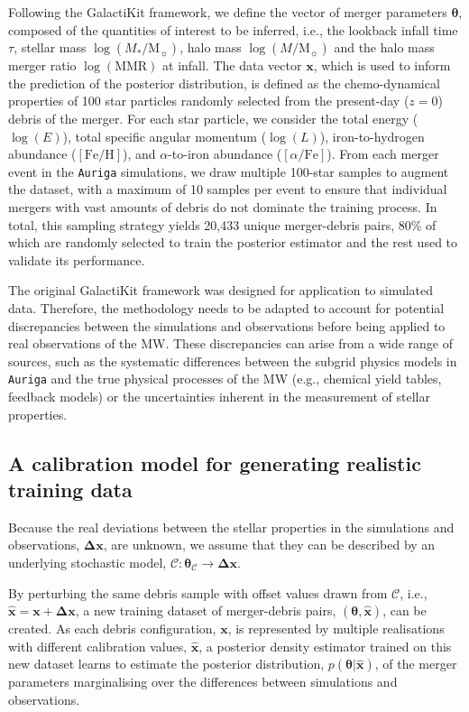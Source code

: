 Following the GalactiKit framework, we define the vector of merger parameters $\bm{\theta}$, composed of the quantities of interest to be inferred, i.e., the lookback infall time $\tau$, stellar mass $\log (M_*/\mathrm{M_{\sun}})$, halo mass $\log (M/\mathrm{M_{\sun}})$ and the halo mass merger ratio $\log (\mathrm{MMR})$ at infall. The data vector $\mathbf{x}$, which is used to inform the prediction of the posterior distribution, is defined as the  chemo-dynamical properties of 100 star particles randomly selected from the present-day ($z=0$) debris of the merger. For each star particle, we consider the total energy ($\log (E)$), total specific angular momentum ($\log (L)$), iron-to-hydrogen abundance ($[\mathrm{Fe}/\mathrm{H}]$), and $\alpha$-to-iron abundance ($[\alpha/\mathrm{Fe}]$).  From each merger event in the \texttt{Auriga} simulations, we draw multiple 100-star samples to augment the dataset, with a maximum of 10 samples per event to ensure that individual mergers with vast amounts of debris do not dominate the training process. In total, this sampling strategy yields 20,433 unique merger-debris pairs, 80\% of which are randomly selected to train the posterior estimator and the rest used to validate its performance.

The original GalactiKit framework was designed for application to simulated data. Therefore, the methodology needs to be adapted to account for potential discrepancies between the simulations and observations before being applied to real observations of the MW. These discrepancies can arise from a wide range of sources, such as the systematic differences between the subgrid physics models in \texttt{Auriga} and the true physical processes of the MW (e.g., chemical yield tables, feedback models) or the uncertainties inherent in the measurement of stellar properties.

\subsection{A calibration model for generating realistic training data}
\label{sec:noise_model}

Because the real deviations between the stellar properties in the simulations and observations, $\mathbf{\Delta x}$, are unknown, we assume that they can be described by an underlying stochastic model, $\mathcal{C}: \bm{\theta_{\mathcal{C}}}\to \bm{\Delta x}$. 
 
By perturbing the same debris sample with offset values drawn from $\mathcal{C}$, i.e., $\mathbf{\hat{x}=x+\Delta x}$, a new training dataset of merger-debris pairs, $(\bm{\theta}, \bm{\hat{x}})$, can be created. As each debris configuration, $\bm{x}$, is represented by multiple realisations with different calibration values, $\bm{\hat{x}}$, a posterior density estimator trained on this new dataset learns to estimate the posterior distribution, $p(\bm{\theta}|\bm{\hat{x}})$, of the merger parameters marginalising over the differences between simulations and observations. 

